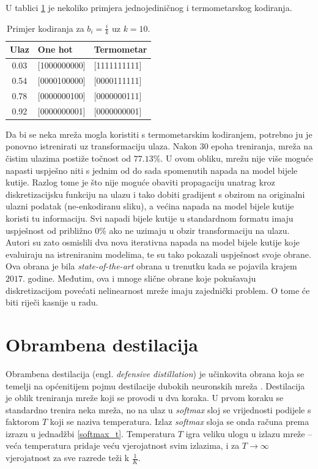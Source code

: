 \documentclass[utf8, diplomski]{fer}
\begin{document}
U tablici \ref{example_encoding} je nekoliko primjera jednojediničnog i termometarskog kodiranja.
\begin{table}[H]
\centering
\begin{tabular}{@{}cll@{}}
\toprule
Ulaz & One hot & Termometar\\ \midrule
0.03 & [1000000000] & [1111111111] \\
0.54 & [0000100000] & [0000111111] \\ 
0.78 & [0000000100] & [0000000111] \\ 
0.92 & [0000000001] & [0000000001] \\ \bottomrule
\end{tabular}
\caption{Primjer kodiranja za $b_{i} = \frac{i}{k}$ uz $k = 10$.}\label{example_encoding}
\end{table}
\par
Da bi se neka mreža mogla koristiti s termometarskim kodiranjem, potrebno ju je ponovno istrenirati uz transformaciju ulaza. Nakon $30$ epoha treniranja, mreža na čistim ulazima postiže točnost od $77.13\%$. U ovom obliku, mrežu nije više moguće napasti uspješno niti s jednim od do sada spomenutih napada na model bijele kutije. Razlog tome je što nije moguće obaviti propagaciju unatrag kroz diskretizacijsku funkciju na ulazu i tako dobiti gradijent s obzirom na originalni ulazni podatak (ne-enkodiranu sliku), a većina napada na model bijele kutije koristi tu informaciju. Svi napadi bijele kutije u standardnom formatu imaju uspješnost od približno $0\%$ ako ne uzimaju u obzir transformaciju na ulazu. \\
Autori su zato osmislili dva nova iterativna napada na model bijele kutije koje evaluiraju na istreniranim modelima, te su tako pokazali uspješnost svoje obrane. Ova obrana je bila \textit{state-of-the-art} obrana u trenutku kada se pojavila krajem $2017.$ godine. Međutim, ova i mnoge slične obrane koje pokušavaju diskretizacijom povećati nelinearnost mreže imaju zajednički problem. O tome će biti riječi kasnije u radu.
\pagebreak
\section{Obrambena destilacija}
Obrambena destilacija (engl. \textit{defensive distillation}) je učinkovita obrana koja se temelji na općenitijem pojmu destilacije dubokih neuronskih mreža \citep{Papernot2016DistillationAA}. Destilacija je oblik treniranja mreže koji se provodi u dva koraka. U prvom koraku se standardno trenira neka mreža, no na ulaz u \textit{softmax} sloj se vrijednosti podijele s faktorom $T$ koji se naziva temperatura. Izlaz \textit{softmax} sloja se onda računa prema izrazu u jednadžbi \ref{softmax_t}. Temperatura $T$ igra veliku ulogu u izlazu mreže -- veća temperatura pridaje veću vjerojatnost svim izlazima, i za $T \rightarrow \infty$ vjerojatnost za sve razrede teži k $\frac{1}{K}$. \par
\end{document}
